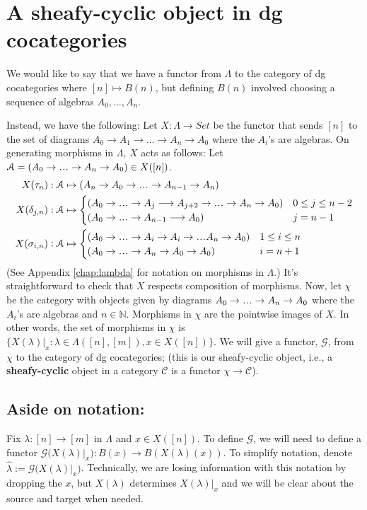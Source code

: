 \section{A sheafy-cyclic object in dg cocategories}\label{sec:cyclic_B(n)}
We would like to say that we have a functor 
from $\Lambda$ to the category of dg 
cocategories where $[n] \mapsto B(n)$, 
but defining $B(n)$ involved choosing a 
sequence of algebras $A_0, \dots, A_n$. 

Instead, we have the following: 
Let $X: \Lambda \to Set$ be the functor 
that sends $[n]$ to the set of diagrams 
$A_0 \to A_1 \to \dots \to A_n \to A_0$ 
where the $A_i$'s are algebras. On 
generating morphisms in $\Lambda$, 
$X$ acts as follows: Let $\mathcal{A} = 
(A_0 \to \smdots \to A_n \to A_0)
\in X([n])$. 
\begin{align*}
X(\tau_n): \mathcal{A}
  &\mapsto (A_n \to A_0 \to \smdots \to A_{n-1} \to A_n)\\
X(\delta_{j,n}): \mathcal{A}
  &\mapsto 
  \begin{cases}
    (A_0 \to \smdots \to A_j\longrightarrow A_{j+2} 
      \to \smdots \to A_n \to A_0) 
    & 0 \leq j \leq n-2\\
    (A_0 \to \smdots \to A_{n-1}\longrightarrow A_0)
    & j = n-1
  \end{cases}\\
X(\sigma_{i,n}): \mathcal{A}
  &\mapsto 
  \begin{cases}
    (A_0 \to \smdots \to 
  		   A_i \to A_i \to \smdots A_n \to A_0)
    & 1 \leq i \leq n\\
    (A_0 \to \smdots \to A_n \to A_0 \to A_0)
    & i=n+1	
  \end{cases}	   
\end{align*}
(See Appendix \ref{chap:lambda} for 
notation on morphisms in $\Lambda$.) It's 
straightforward to 
check that $X$ respects composition of morphisms. 
Now, let $\chi$ be the category with objects given by
diagrams $A_0 \to \smdots \to A_n \to A_0$ 
where the $A_i$'s are algebras and $n \in \mathbb{N}$. 
Morphisms in $\chi$ are the pointwise images of 
$X$. In other words, the set of morphisms in
$\chi$ is $\{ X(\lambda)|_x: \lambda \in 
\Lambda([n],[m]), x \in X([n]) \}$. We will give 
a functor, $\mathcal{G}$, from $\chi$ to the 
category of dg 
cocategories; (this is our sheafy-cyclic object, 
i.e., a \textbf{sheafy-cyclic} object in a 
category $\mathcal{C}$ is a functor $\chi \to 
\mathcal{C}$).
%
\subsection{Aside on notation:} 
Fix $\lambda:[n] \to [m]$ in $\Lambda$ 
and $x \in X([n])$. To define $\mathcal{G}$, 
we will need to define a functor $\mathcal{G}
\big(X(\lambda)|_x \big): B(x) \to B(X(\lambda)(x))$. 
To simplify notation, denote 
$\hat{\lambda} := \mathcal{G}
\big(X(\lambda)|_x \big)$. Technically, we 
are losing information with this notation by 
dropping the $x$, but $X(\lambda)$ determines 
$X(\lambda)|_x$ and we will be clear 
about the source and target when needed.
%
